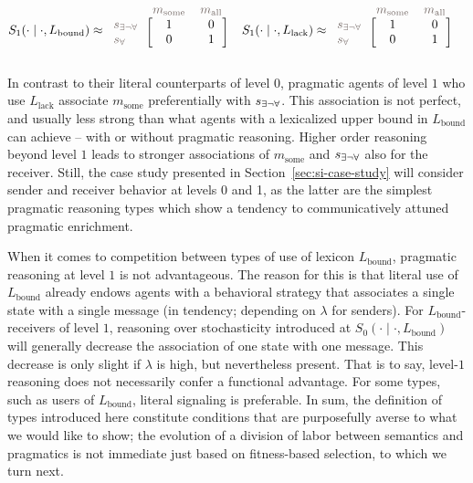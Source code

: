 \documentclass[a4paper, 11pt]{article}
\theoremstyle{Satz}
\newcommand{\state}{\ensuremath{s}\xspace}		%
\newcommand{\mystate}[1]{\ensuremath{\state_{\text{#1}}}\xspace} %
\newcommand{\mylang}[1]{\ensuremath{L_{\text{#1}}}\xspace} %
\newcommand{\messg}{\ensuremath{m}\xspace}		%
\newcommand{\mymessg}[1]{\ensuremath{\messg_{\text{#1}}}\xspace} %
\newcommand{\ssome}{\mystate{\ensuremath{\exists\neg\forall}}}
\newcommand{\sall}{\mystate{\ensuremath{\forall}}}
\newcommand{\msome}{\mymessg{some}}
\newcommand{\mall}{\mymessg{all}}
\newcommand{\Lbound}{\mylang{bound}}
\newcommand{\Llack}{\mylang{lack}}
\newcommand{\mygray}[1]{{\textcolor{mygray}{#1}}}
\begin{document}
\begin{align*}
  S_1(\cdot \mid \cdot, \Lbound) & \approx \begin{blockarray}{lcc}
    & \mygray{\msome} & \mygray{\mall} \\
    \begin{block}{l[cc]}
      \mygray{\ssome} & 1 & 0 \\
      \mygray{\sall}  & 0 & 1 \\
    \end{block}
  \end{blockarray} &
  S_1(\cdot \mid \cdot, \Llack) & \approx \begin{blockarray}{lcc}
    & \mygray{\msome} & \mygray{\mall} \\
    \begin{block}{l[cc]}
      \mygray{\ssome} & 1 & 0 \\
      \mygray{\sall}  & 0 & 1 \\
    \end{block}
  \end{blockarray} 
\end{align*}


In contrast to their literal counterparts of level $0$, pragmatic agents of level $1$ who use
$\Llack$ associate $\msome$ preferentially with $\ssome$. This association is not perfect, and
usually less strong than what agents with a lexicalized upper bound in $\Lbound$ can achieve --
with or without pragmatic reasoning. Higher order reasoning beyond level $1$ leads to stronger
associations of $\msome$ and $\ssome$ also for the receiver. Still, the case study presented in
Section~\ref{sec:si-case-study} will consider sender and receiver behavior at levels 0 and 1,
as the latter are the simplest pragmatic reasoning types which show a tendency to
communicatively attuned pragmatic enrichment.

When it comes to competition between types of use of lexicon $\Lbound$, pragmatic reasoning at
level $1$ is not advantageous. The reason for this is that literal use of $\Lbound$ already
endows agents with a behavioral strategy that associates a single state with a single message
(in tendency; depending on $\lambda$ for senders). For $\Lbound$-receivers of level $1$,
reasoning over stochasticity introduced at $S_0( \cdot \mid \cdot, \Lbound)$ will generally
decrease the association of one state with one message. This decrease is only slight if
$\lambda$ is high, but nevertheless present. That is to say, level-$1$ reasoning does not
necessarily confer a functional advantage. For some types, such as users of $\Lbound$, literal
signaling is preferable. In sum, the definition of types introduced here constitute conditions
that are purposefully averse to what we would like to show; the evolution of a division of labor between semantics and pragmatics is not immediate
just based on fitness-based selection, to which we turn next.
\end{document}
